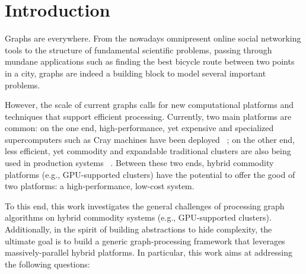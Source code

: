 \section{Introduction}
Graphs are everywhere. From the nowadays omnipresent online social networking tools to the structure of fundamental scientific problems, passing through mundane applications such as finding the best bicycle route between two points in a city, graphs are indeed a building block to model several important problems.

However, the scale of current graphs calls for new computational platforms and techniques that support efficient processing. Currently, two main platforms are common: on the one end, high-performance, yet expensive and specialized supercomputers such as Cray machines have been deployed ~\cite{mizell2009early, yoo2005scalable}; on the other end, less efficient, yet commodity and expandable traditional clusters are also being used in production systems ~\cite{Malewicz2009}. Between these two ends, hybrid commodity platforms (e.g., GPU-supported clusters) have the potential to offer the good of two platforms: a high-performance, low-cost system.

To this end, this work investigates the general challenges of processing graph algorithms on hybrid commodity systems (e.g., GPU-supported clusters). Additionally, in the spirit of building abstractions to hide complexity, the ultimate goal is to build a generic graph-processing framework that leverages massively-parallel hybrid platforms. In particular, this work aims at addressing the following questions:

